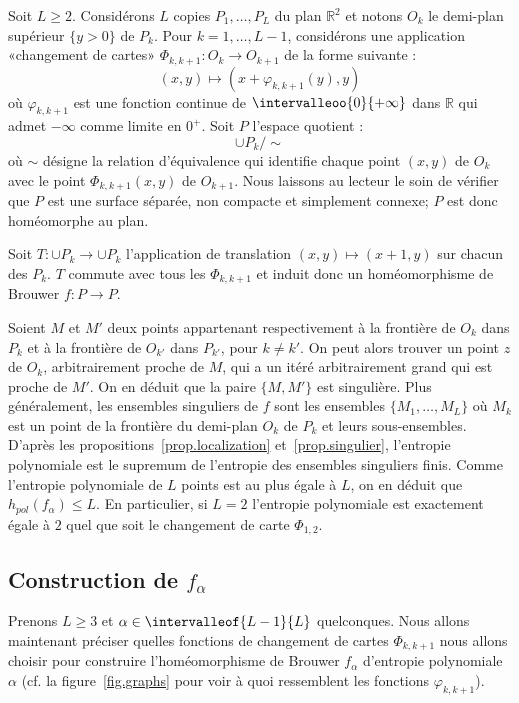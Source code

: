\documentclass[11pt]{article}
\providecommand{\og}{«\nobreakspace}
\providecommand{\fg}{\nobreakspace»}
\theoremstyle{definition}
\numberwithin{equation}{section}
\numberwithin{figure}{section}
\numberwithin{table}{section}
\newcommand{\bbR}{{\mathbb{R}}}
\begin{document}
Soit $L \geq 2$. Considérons $L$ copies $P_{1}, \dots, P_{L}$ du plan $\bbR^2$ et notons $O_{k}$ le demi-plan supérieur $\{y>0\}$ de $P_{k}$. Pour $k=1, \dots, L-1$, {considérons une application \og changement de cartes\fg{} $\Phi_{k,k+1}: O_{k} \to O_{k+1}$ de la forme suivante} :
\[
(x,y) \longmapsto (x+\varphi_{k,k+1}(y), y)
\]
où $\varphi_{k,k+1}$ est une fonction continue de $\intervalleoo{0}{+\infty}$ dans $\bbR$ qui admet $-\infty$ comme limite en $0^+$. Soit $P$ l'espace quotient :
\[
\cup P_{k} / \sim
\]
où $\sim$ désigne la relation d'équivalence qui identifie {chaque point} $(x,y)$ de $O_k$ avec le point $\Phi_{k,k+1}(x,y)$ de $O_{k+1}$. Nous laissons au lecteur le soin de vérifier que $P$ est une surface séparée, non compacte et simplement connexe; $P$ est donc homéomorphe au plan.

Soit $T : \cup P_{k} \to \cup P_{k}$ l'application de translation $(x,y) \mapsto (x+1,y)$ sur chacun des $P_{k}$. $T$ commute avec tous les $\Phi_{k,k+1}$ et induit donc un homéomorphisme de Brouwer $f: P \to P$.

{Soient $M$ et $M'$ deux points appartenant respectivement à la frontière de $O_{k}$ dans $P_{k}$ et à la frontière de $O_{k'}$ dans $P_{k'}$, pour $k
\neq k'$. On peut alors trouver un point $z$ de $O_{k}$, arbitrairement proche de $M$, qui a un itéré arbitrairement grand qui est proche de $M'$. On en déduit que la paire $\{M,M'\}$ est singulière. Plus généralement,} les ensembles singuliers de $f$ sont les ensembles $\{M_1, \dots, M_L\}$ où $M_k$ est un point de la frontière du demi-plan $O_{k}$ de $P_k$ et leurs sous-ensembles. D'après les propositions~\ref{prop.localization} et~\ref{prop.singulier}, l'entropie polynomiale est le supremum de l'entropie des ensembles singuliers finis. Comme l'entropie polynomiale de $L$ points est {au plus égale} à $L$, on en déduit que $h_{pol}(f_{\alpha}) \leq L$. En particulier, si $L=2$ l'entropie polynomiale est exactement égale à $2$ quel que soit le changement de carte $\Phi_{1,2}$.

\subsection{Construction de \texorpdfstring{$f_\alpha$}{falpha}}

Prenons $L \geq 3$ et $\alpha \in \intervalleof{L-1}{L}$ quelconques. Nous allons maintenant préciser quelles fonctions de changement de cartes $\Phi_{k,k+1}$ nous allons choisir pour construire l'homéomorphisme de Brouwer $f_\alpha$ d'entropie polynomiale $\alpha$ (cf. la figure~\ref{fig.graphs} pour voir à quoi ressemblent les fonctions $\varphi_{k,k+1}$).
\end{document}
